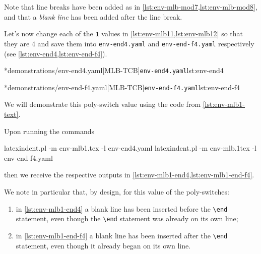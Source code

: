 	Note that line breaks have been added as in \cref{lst:env-mlb-mod7,lst:env-mlb-mod8}, and that a
	\emph{blank line} has been added after the line break.

	Let's now change%
	 each of
	the \texttt{1} values in \cref{lst:env-mlb11,lst:env-mlb12} so that they are
	$4$ and save them into \texttt{env-end4.yaml} and
	\texttt{env-end-f4.yaml} respectively (see \cref{lst:env-end4,lst:env-end-f4}).

	\begin{minipage}{.45\textwidth}
		\cmhlistingsfromfile*[style=yaml-LST]*{demonstrations/env-end4.yaml}[MLB-TCB]{\texttt{env-end4.yaml}}{lst:env-end4}
	\end{minipage}
	\hfill
	\begin{minipage}{.5\textwidth}
		\cmhlistingsfromfile*[style=yaml-LST]*{demonstrations/env-end-f4.yaml}[MLB-TCB]{\texttt{env-end-f4.yaml}}{lst:env-end-f4}
	\end{minipage}

	We will demonstrate this poly-switch value using the code from
	\vref{lst:env-mlb1-text}.

	Upon running the commands
	\begin{commandshell}
latexindent.pl -m env-mlb1.tex -l env-end4.yaml
latexindent.pl -m env-mlb.1tex -l env-end-f4.yaml
\end{commandshell}

	then we receive the respective outputs in \cref{lst:env-mlb1-end4,lst:env-mlb1-end-f4}.

	\begin{cmhtcbraster}[raster column skip=.1\linewidth]
	\end{cmhtcbraster}

	We note in particular that, by design, for this value of the poly-switches:
	\begin{enumerate}
		\item in \cref{lst:env-mlb1-end4} a blank line has been inserted before the
		      \lstinline!\end! statement, even though the \lstinline!\end!
		      statement was already on its own line;
		\item in \cref{lst:env-mlb1-end-f4} a blank line has been inserted after the
		      \lstinline!\end! statement, even though it already began on its own line.
	\end{enumerate}

